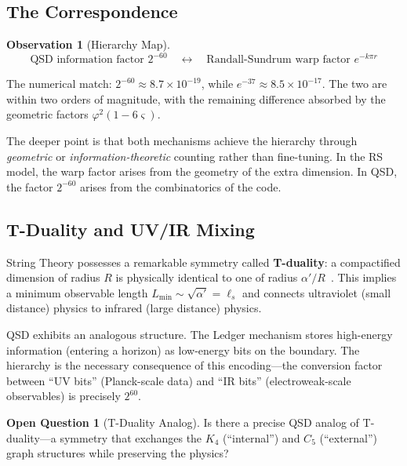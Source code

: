 \documentclass[11pt,a4paper]{article}
\theoremstyle{definition}
\newtheorem{observation}[theorem]{Observation}
\newtheorem{question}[theorem]{Open Question}
\newcommand{\strain}{\varsigma}            %
\newcommand{\gr}{\varphi}
\newcommand{\ap}{\alpha'}
\newcommand{\ls}{\ell_s}
\begin{document}
\subsection{The Correspondence}

\begin{observation}[Hierarchy Map]
\label{obs:hierarchy}
\begin{equation}
\text{QSD information factor } 2^{-60} \quad \longleftrightarrow \quad
\text{Randall-Sundrum warp factor } e^{-k\pi r}
\end{equation}
\end{observation}

The numerical match: $2^{-60} \approx 8.7 \times 10^{-19}$, while
$e^{-37} \approx 8.5 \times 10^{-17}$.  The two are within two orders of
magnitude, with the remaining difference absorbed by the geometric
factors $\gr^2(1-6\strain)$.

The deeper point is that both mechanisms achieve the hierarchy through
\emph{geometric} or \emph{information-theoretic} counting rather than
fine-tuning.  In the RS model, the warp factor arises from the geometry
of the extra dimension.  In QSD, the factor $2^{-60}$ arises from the
combinatorics of the code.

\subsection{T-Duality and UV/IR Mixing}

String Theory possesses a remarkable symmetry called \textbf{T-duality}: a
compactified dimension of radius $R$ is physically identical to one of
radius $\ap/R$~\cite{Polchinski1998v1}.  This implies a minimum observable length
$L_{\text{min}} \sim \sqrt{\ap} = \ls$ and connects ultraviolet (small
distance) physics to infrared (large distance) physics.

QSD exhibits an analogous structure.  The Ledger mechanism stores
high-energy information (entering a horizon) as low-energy bits on the
boundary.  The hierarchy is the necessary consequence of this
encoding---the conversion factor between ``UV bits'' (Planck-scale data)
and ``IR bits'' (electroweak-scale observables) is precisely $2^{60}$.

\begin{question}[T-Duality Analog]
Is there a precise QSD analog of T-duality---a symmetry that exchanges the
$K_4$ (``internal'') and $C_5$ (``external'') graph structures while
preserving the physics?
\end{question}
\end{document}
